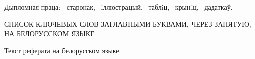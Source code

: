 Дыпломная праца: \ старонак, \totalfigures{}~iллюстрацый, \totaltables{}~таблiц,
\ крынiц, \ дадаткаў.


\vspace{\baselineskip}

СПИСОК КЛЮЧЕВЫХ СЛОВ ЗАГЛАВНЫМИ БУКВАМИ, ЧЕРЕЗ ЗАПЯТУЮ, НА БЕЛОРУССКОМ ЯЗЫКЕ

\vspace{\baselineskip}

Текст реферата на белорусском языке.
